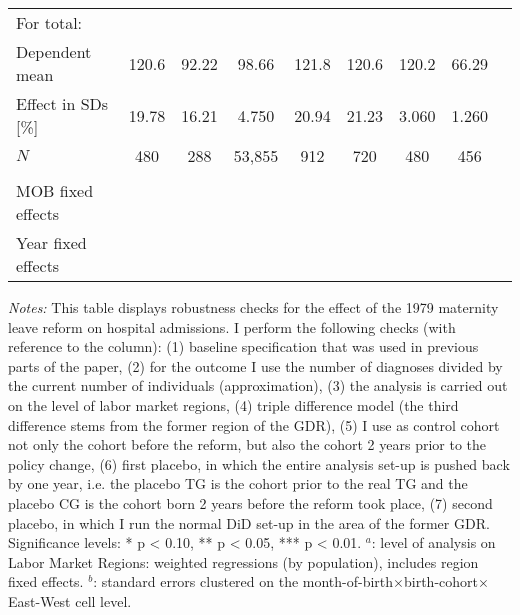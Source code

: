 \begin{landscape}
\begin{table}[htbp]
\begin{threeparttable}
{\begin{tabular}{l*{8}{c}}
					For total: 																																					\\							 
					Dependent mean 		&   120.6			&	92.22			&   98.66     		&	121.8			&  120.6			&	120.2			&	66.29		\\
					Effect in SDs [\%] 	&   19.78			&	16.21			&   4.750      		&	20.94			&  21.23			&	3.060			&	1.260		\\
					$N$ 				&   480				&	288				&   53,855    		&	912				&  720				&	480				&	456			\\
					\\
					MOB fixed effects 	&   \checkmark		&	\checkmark		&   \checkmark		& \checkmark		& \checkmark		&	\checkmark		&  \checkmark	\\ 
					Year fixed effects  &   \checkmark		&	\checkmark		&   \checkmark		& \checkmark		& \checkmark		&	\checkmark		&  \checkmark	\\ 
					\bottomrule
			\end{tabular}}
	\end{threeparttable} 
		\begin{minipage}{0.66\linewidth}
		\scriptsize \emph{Notes:} This table displays robustness checks for the effect of the 1979 maternity leave reform on hospital admissions. I perform the following checks (with reference to the column): (1) baseline specification that was used in previous parts of the paper, (2) for the outcome I use the number of diagnoses divided by the current number of individuals (approximation), (3) the analysis is carried out on the level of labor market regions, (4) triple difference model (the third difference stems from the former region of the GDR), (5) I use as control cohort not only the cohort before the reform, but also the cohort 2 years prior to the policy change, (6) first placebo, in which the entire analysis set-up is pushed back by one year, i.e. the placebo TG is the cohort prior to the real TG and the placebo CG is the cohort born 2 years before the reform took place, (7) second placebo, in which I run the normal DiD set-up in the area of the former GDR. \newline Significance levels: * p < 0.10, ** p < 0.05, *** p < 0.01. \newline
		\hspace*{15 pt}$^a$: level of analysis on Labor Market Regions: weighted regressions (by population), includes region fixed effects.\newline
		\hspace*{15 pt}$^b$: standard errors clustered on the month-of-birth$\times$birth-cohort$\times$East-West cell level.
	\end{minipage}
\end{table} 
	\vspace*{\fill}\clearpage
\end{landscape}






